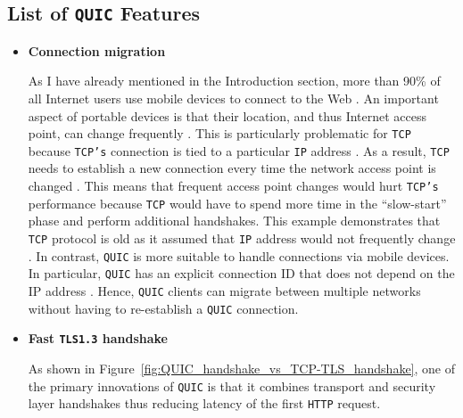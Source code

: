 \documentclass[12pt,a4paper,twoside,openright]{report}
\begin{document}
\subsection{List of \texttt{QUIC} Features}
\begin{itemize}


 \item \textbf{Connection migration} 
 
    As I have already mentioned in the Introduction section, more than 90\% of all Internet users use mobile devices to connect to the Web \cite{bib_number_of_mobile_users}.
    An important aspect of portable devices is that their location, and thus Internet access point, can change frequently \cite{PollardBarry2019HiAP}.
    This is particularly problematic for \texttt{TCP} because \texttt{TCP's} connection is tied to a particular \texttt{IP} address \cite{PollardBarry2019HiAP}.
    As a result, \texttt{TCP} needs to establish a new connection every time the network access point is changed \cite{PollardBarry2019HiAP}.
    This means that frequent access point changes would hurt \texttt{TCP's} performance because \texttt{TCP} would have to spend more time in the \enquote{slow-start} phase and perform additional handshakes.
    This example demonstrates that \texttt{TCP} protocol is old as it assumed that \texttt{IP} address would not frequently change \cite{PollardBarry2019HiAP}.
    In contrast, \texttt{QUIC} is more suitable to handle connections via mobile devices.
    In particular, \texttt{QUIC} has an explicit connection ID that does not depend on the IP address \cite{PollardBarry2019HiAP}.
    Hence, \texttt{QUIC} clients can migrate between multiple networks without having to re-establish a \texttt{QUIC} connection.
    
    
    





\item \textbf{Fast \texttt{TLS1.3} handshake}

As shown in Figure~\ref{fig:QUIC_handshake_vs_TCP-TLS_handshake}, one of the primary innovations of \texttt{QUIC} is that it combines transport and security layer handshakes thus reducing latency of the first \texttt{HTTP} request.



\end{itemize}
\end{document}
